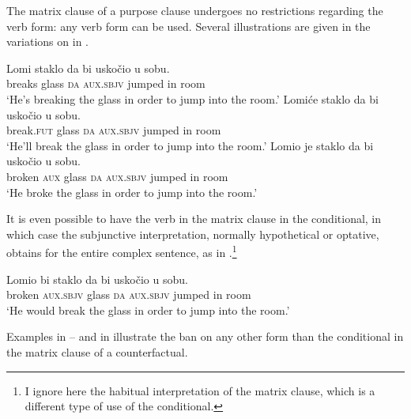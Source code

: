 \documentclass[output=paper,
colorlinks,
citecolor=brown,
newtxmath
]{langscibook}
\begin{document}
\noindent The matrix clause of a purpose clause undergoes no restrictions regarding the verb form: any verb form can be used. Several illustrations are given in the variations on  in .

\ea\label{ex:Final-m-verb}
\ea \gll Lomi staklo da bi uskočio u sobu.\\
    breaks glass \textsc{da} \textsc{aux.sbjv} jumped in room\\
    \glt `He's breaking the glass in order to jump into the room.'\label{ex:Final-m-verb-a}
\ex \gll Lomiće staklo da bi uskočio u sobu.\\
    break.\textsc{fut} glass \textsc{da} \textsc{aux.sbjv} jumped in room\\
    \glt `He'll break the glass in order to jump into the room.'\label{ex:Final-m-verb-b}
\ex \gll Lomio je staklo da bi uskočio u sobu.\\
    broken \textsc{aux} glass \textsc{da} \textsc{aux.sbjv} jumped in room\\
    \glt `He broke the glass in order to jump into the room.'\label{ex:Final-m-verb-c}
\z\z

\noindent It is even possible to have the verb in the matrix clause in the conditional, in which case the subjunctive interpretation, normally hypothetical or optative, obtains for the entire complex sentence, as in .\footnote{I ignore here the habitual interpretation of the matrix clause, which is a different type of use of the conditional.}

\ea\label{ex:Final-subj-verb}
\gll Lomio bi staklo da bi uskočio u sobu.\\
    broken \textsc{aux.sbjv} glass \textsc{da} \textsc{aux.sbjv} jumped in room\\
    \glt `He would break the glass in order to jump into the room.'
\z

\noindent Examples in -- and in  illustrate the ban on any other form than the conditional in the matrix clause of a counterfactual.

\ea\label{ex:Unreal-m-verb}
\label{ex:Unreal-m-verb-a}
\label{ex:Unreal-m-verb-b}
\z\z
\end{document}
